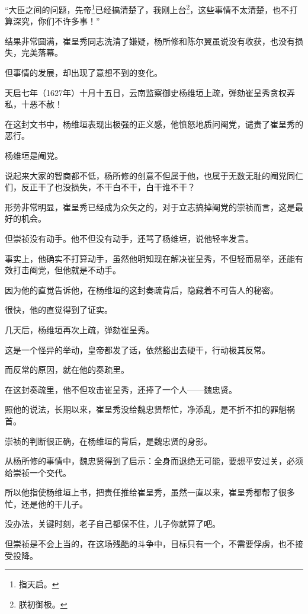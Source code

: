 \begin{multicols}{\theparacolNo}
“大臣之间的问题，先帝\footnote{指天启。}已经搞清楚了，我刚上台\footnote{朕初御极。}，这些事情不太清楚，也不打算深究，你们不许多事！”

结果非常圆满，崔呈秀同志洗清了嫌疑，杨所修和陈尔翼虽说没有收获，也没有损失，完美落幕。

但事情的发展，却出现了意想不到的变化。

天启七年（1627年）十月十五日，云南监察御史杨维垣上疏，弹劾崔呈秀贪权弄私，十恶不赦！

在这封文书中，杨维垣表现出极强的正义感，他愤怒地质问阉党，谴责了崔呈秀的恶行。

杨维垣是阉党。

说起来大家的智商都不低，杨所修的创意不但属于他，也属于无数无耻的阉党同仁们，反正干了也没损失，不干白不干，白干谁不干？

形势非常明显，崔呈秀已经成为众矢之的，对于立志搞掉阉党的崇祯而言，这是最好的机会。

但崇祯没有动手。他不但没有动手，还骂了杨维垣，说他轻率发言。

事实上，他确实不打算动手，虽然他明知现在解决崔呈秀，不但轻而易举，还能有效打击阉党，但他就是不动手。

因为他的直觉告诉他，在杨维垣的这封奏疏背后，隐藏着不可告人的秘密。

很快，他的直觉得到了证实。

几天后，杨维垣再次上疏，弹劾崔呈秀。

这是一个怪异的举动，皇帝都发了话，依然豁出去硬干，行动极其反常。

而反常的原因，就在他的奏疏里。

在这封奏疏里，他不但攻击崔呈秀，还捧了一个人——魏忠贤。

照他的说法，长期以来，崔呈秀没给魏忠贤帮忙，净添乱，是不折不扣的罪魁祸首。

崇祯的判断很正确，在杨维垣的背后，是魏忠贤的身影。

从杨所修的事情中，魏忠贤得到了启示：全身而退绝无可能，要想平安过关，必须给崇祯一个交代。

所以他指使杨维垣上书，把责任推给崔呈秀，虽然一直以来，崔呈秀都帮了很多忙，还是他的干儿子。

没办法，关键时刻，老子自己都保不住，儿子你就算了吧。

但崇祯是不会上当的，在这场残酷的斗争中，目标只有一个，不需要俘虏，也不接受投降。
\ifnum{}
	\end{multicols}
\fi
\newpage
